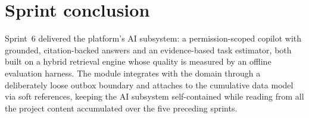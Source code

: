 
\section{Sprint conclusion}

Sprint~6 delivered the platform's AI subsystem: a permission-scoped copilot with grounded,
citation-backed answers and an evidence-based task estimator, both built on a hybrid retrieval
engine whose quality is measured by an offline evaluation harness. The module integrates with
the domain through a deliberately loose outbox boundary and attaches to the cumulative data model
via soft references, keeping the AI subsystem self-contained while reading from all the project
content accumulated over the five preceding sprints.

